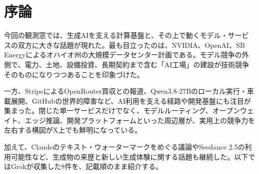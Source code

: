 \section{序論}
今回の観測窓では、生成AIを支える計算基盤と、その上で動くモデル・サービスの双方に大きな話題が現れた。最も目立ったのは、NVIDIA、OpenAI、SB Energyによるオハイオ州の大規模データセンター計画である。モデル競争の外側で、電力、土地、設備投資、長期契約まで含む「AI工場」の建設が技術競争そのものになりつつあることを印象づけた。

一方、StripeによるOpenRouter買収との報道、Qwen3.8-27Bのローカル実行・車載展開、GitHubの世界的障害など、AI利用を支える経路や開発基盤にも注目が集まった。閉じた単一サービスだけでなく、モデルルーティング、オープンウェイト、エッジ推論、開発プラットフォームといった周辺層が、実用上の競争力を左右する構図がX上でも鮮明になっている。

加えて、Claudeのテキスト・ウォーターマークをめぐる議論やSeedance 2.5の利用可能性など、生成物の来歴と新しい生成体験に関する話題も継続した。以下ではGrokが収集した8件を、記載順のまま紹介する。
